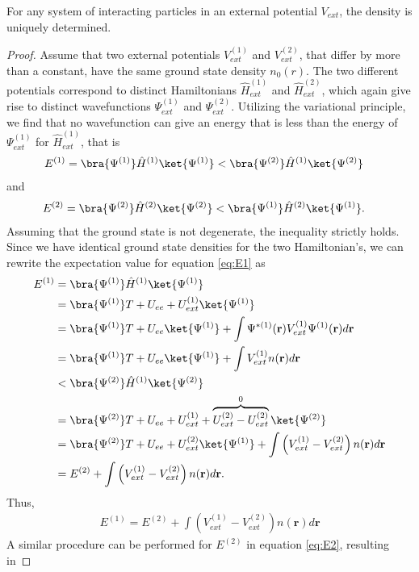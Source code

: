 \begin{theorem}
  For any system of interacting particles in an external potential $V_{ext}$, the density is uniquely determined.
\end{theorem}
\begin{proof}
  Assume that two external potentials $V_{ext}^{(1)}$ and $V_{ext}^{(2)}$, that differ by more than a constant, have the same ground state density $n_0(r)$. The two different potentials correspond to distinct Hamiltonians $\hat{H}_{ext}^{(1)}$ and $\hat{H}_{ext}^{(2)}$, which again give rise to distinct wavefunctions $\Psi_{ext}^{(1)}$ and $\Psi_{ext}^{(2)}$. Utilizing the variational principle, we find that no wavefunction can give an energy that is less than the energy of $\Psi_{ext}^{(1)}$ for $\hat{H}_{ext}^{(1)}$, that is
  \begin{align}
    E^{(1)} = \bra{\Psi^{(1)}}\hat{H}^{(1)}\ket{\Psi^{(1)}} &< \bra{\Psi^{(2)}}\hat{H}^{(1)}\ket{\Psi^{(2)}} \label{eq:E1}
  \end{align}
  and
  \begin{align}
    E^{(2)} = \bra{\Psi^{(2)}}\hat{H}^{(2)}\ket{\Psi^{(2)}} &< \bra{\Psi^{(1)}}\hat{H}^{(2)}\ket{\Psi^{(1)}}.
    \label{eq:E2}
  \end{align}
  Assuming that the ground state is not degenerate, the inequality strictly holds. Since we have identical ground state densities for the two Hamiltonian's, we can rewrite the expectation value for equation \ref{eq:E1} as
  \begin{align*}
    E^{(1)} &= \bra{\Psi^{(1)}}\hat{H}^{(1)}\ket{\Psi^{(1)}} \\
    &= \bra{\Psi^{(1)}}T + U_{ee} + U_{ext}^{(1)}\ket{\Psi^{(1)}} \\
    &= \bra{\Psi^{(1)}} T + U_{ee} \ket{\Psi^{(1)}} + \int \Psi^{*(1)}(\textbf{r})V_{ext}^{(1)}\Psi^{(1)}(\textbf{r})d\textbf{r} \\
    &= \bra{\Psi^{(1)}} T + U_{ee} \ket{\Psi^{(1)}} + \int V_{ext}^{(1)} n(\textbf{r})d\textbf{r} \\
    &< \bra{\Psi^{(2)}}\hat{H}^{(1)}\ket{\Psi^{(2)}} \\
    &= \bra{\Psi^{(2)}} T + U_{ee} + U_{ext}^{(1)} + \overbrace{U_{ext}^{(2)} - U_{ext}^{(2)} }^{0} \ket{\Psi^{(2)}}\\
    &= \bra{\Psi^{(2)}} T + U_{ee} + U_{ext}^{(2)}\ket{\Psi^{(1)}} + \int \left(V_{ext}^{(1)} - V_{ext}^{(2)}\right) n(\textbf{r})d\textbf{r} \\
    &= E^{(2)} + \int \left(V_{ext}^{(1)} - V_{ext}^{(2)}\right) n(\textbf{r})d\textbf{r}.
  \end{align*}
Thus,
\begin{align}
  E^{(1)} = E^{(2)} + \int \left(V_{ext}^{(1)} - V_{ext}^{(2)}\right) n(\textbf{r})d\textbf{r}
\end{align}
A similar procedure can be performed for $E^{(2)}$ in equation \ref{eq:E2}, resulting in


\end{proof}
